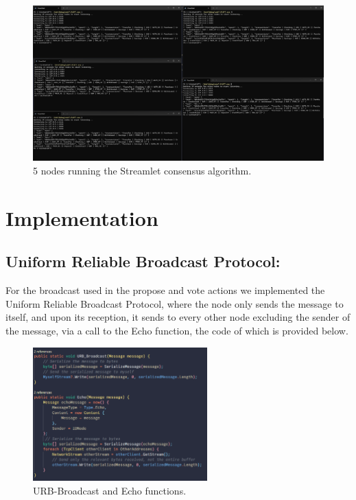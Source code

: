 \documentclass[11pt]{report}
\begin{document}
\vspace{20pt}
\begin{figure}[h]
    \centering
    \includegraphics[width=1\textwidth]{5nodes.png}
    \caption{5 nodes running the Streamlet consensus algorithm.}
\end{figure}
\vspace{20pt}


\pagebreak
\section{Implementation}
\subsection{Uniform Reliable Broadcast Protocol:}
For the broadcast used in the propose and vote actions we implemented the Uniform Reliable Broadcast Protocol, where the node only sends the message to itself, and upon its reception, it sends to every other node excluding the sender of the message, via a call to the Echo function, the code of which is provided below. 

\vspace{20pt}
\begin{figure}[h]
    \centering
    \includegraphics[width=0.6\textwidth]{broadecho.png}
    \caption{URB-Broadcast and Echo functions.}
\end{figure}
\vspace{20pt}
\end{document}
